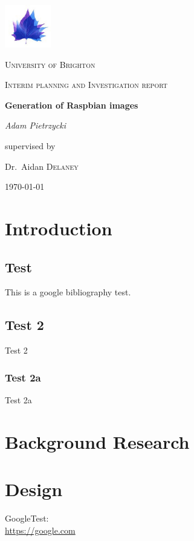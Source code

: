\documentclass[12pt,a4paper]{report}
\begin{document}
\begin{titlepage}
	\centering
	\includegraphics[width=0.15\textwidth]{Brighton-University-logo.png}\par
	{\scshape\LARGE University of Brighton\par}
	\vspace{1cm}
	{\scshape\Large Interim planning and Investigation report\par}
	\vspace{1.5cm}
	{\huge\bfseries Generation of Raspbian images\par}
	\vspace{2cm}
	{\Large\itshape Adam Pietrzycki\par}
	\vfill
	supervised by\par
	Dr.~Aidan \textsc{Delaney}
	\vfill

	{\large \today\par}
\end{titlepage}

\begin{abstract}

\end{abstract}

\pagebreak
\tableofcontents
\pagebreak

\chapter{Introduction}
\section{Test}
This is a google \cite{google} bibliography test.
\section{Test 2}
Test 2
\subsection{Test 2a}
Test 2a

\chapter{Background Research}

\chapter{Design}

\begin{thebibliography}{9}
GoogleTest:
\\\url{https://google.com}
\end{thebibliography}
\end{document}
